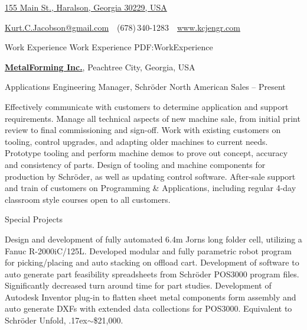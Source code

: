 \documentclass[
letterpaper,
MMMyyyy,
nonstopmode,
]{resume}
\makeatletter
\newcommand{\CVAuthor}{Kurt C. Jacobson}
\newcommand{\CVWebpage}{www.kcjengr.com}
\newcommand{\CVEmail}{Kurt.C.Jacobson@gmail.com}
\makeatother
\begin{document}

\Title{\CVAuthor}

\begin{SubTitle}
\href{https://www.google.com/maps/place/155+Main+St,+Haralson,+GA+30229/}
{155 Main St., Haralson, Georgia 30229, USA}
\par
\href{mailto:\CVEmail}
{\CVEmail}
\,\SubBulletSymbol\,
(678)\,340-1283
\,\SubBulletSymbol\,
\href{\CVWebpage}
{\url{\CVWebpage}}
\end{SubTitle}

\begin{Body}



\Section
{Work Experience}
{Work Experience}
{PDF:WorkExperience}


\Entry
\href{http://www.metalforming-usa.net/}
{\textbf{MetalForming Inc.}},
Peachtree City, Georgia, USA

\Gap
\BulletItem
Applications Engineering Manager,
Schr{\"o}der North American Sales
\hfill
{} --
Present
\begin{Detail}
\SubBulletItem
Effectively communicate with customers to determine application and support requirements. 
\SubBulletItem
Manage all technical aspects of new machine sale, from initial print review to final commissioning and sign-off.
\SubBulletItem
Work with existing customers on tooling, control upgrades, and adapting older machines to current needs.  
\SubBulletItem
Prototype tooling and perform machine demos to prove out concept, accuracy and consistency of parts.
\SubBulletItem
Design of tooling and machine components for production by Schr{\"o}der, as well as updating control software.
\SubBulletItem
After-sale support and train of customers on Programming {\&} Applications, including regular 4-day classroom style courses open to all customers.
\end{Detail}

\Gap
\BulletItem
Special Projects
\hfill
\begin{Detail}
\SubBulletItem
Design and development of fully automated 6.4m Jorns long folder cell, utilizing a Fanuc R-2000iC/125L.
Developed modular and fully parametric robot program for picking/placing and auto stacking on offload cart.
\SubBulletItem
Development of software to auto generate part feasibility spreadsheets from Schr{\"o}der POS3000 program files.
Significantly decreased turn around time for part studies.
\SubBulletItem
Development of Autodesk Inventor plug-in to flatten sheet metal components form assembly and auto generate DXFs with extended data collections for POS3000. Equivalent to  Schr{\"o}der Unfold, {\raise.17ex\hbox{$\scriptstyle\mathtt{\sim}$}}{\$}21,000.
\end{Detail}


\end{Body}
\end{document}
